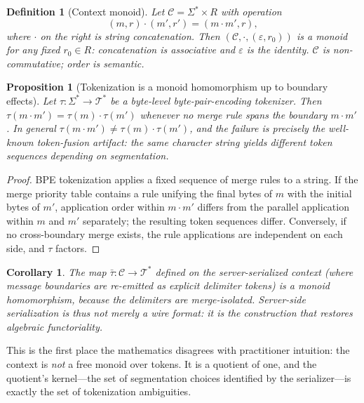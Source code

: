 \documentclass[11pt]{article}
\newtheorem{proposition}[theorem]{Proposition}
\newtheorem{definition}[theorem]{Definition}
\newtheorem{corollary}[theorem]{Corollary}
\begin{document}
\begin{definition}[Context monoid]
Let $\mathcal{C} = \Sigma^* \times R$ with operation
\[
(m, r) \cdot (m', r') = (m \cdot m', r),
\]
where $\cdot$ on the right is string concatenation. Then
$(\mathcal{C}, \cdot, (\varepsilon, r_0))$ is a monoid for any fixed
$r_0 \in R$: concatenation is associative and $\varepsilon$ is the identity.
$\mathcal{C}$ is non-commutative; order is semantic.
\end{definition}

\begin{proposition}[Tokenization is a monoid homomorphism up to boundary effects]
Let $\tau : \Sigma^* \to \mathcal{T}^*$ be a byte-level byte-pair-encoding
tokenizer. Then $\tau(m \cdot m') = \tau(m) \cdot \tau(m')$ \emph{whenever no
merge rule spans the boundary} $m \cdot m'$. In general
$\tau(m \cdot m') \neq \tau(m) \cdot \tau(m')$, and the failure is precisely
the well-known token-fusion artifact: the same character string yields
different token sequences depending on segmentation.
\end{proposition}

\begin{proof}
BPE tokenization applies a fixed sequence of merge rules to a string. If the
merge priority table contains a rule unifying the final bytes of $m$ with the
initial bytes of $m'$, application order within $m \cdot m'$ differs from the
parallel application within $m$ and $m'$ separately; the resulting token
sequences differ. Conversely, if no cross-boundary merge exists, the rule
applications are independent on each side, and $\tau$ factors.
\end{proof}

\begin{corollary}
The map $\bar\tau : \mathcal{C} \to \mathcal{T}^*$ defined on the
\emph{server-serialized} context (where message boundaries are re-emitted as
explicit delimiter tokens) \emph{is} a monoid homomorphism, because the
delimiters are merge-isolated. Server-side serialization is thus not merely a
wire format: it is the construction that restores algebraic functoriality.
\end{corollary}

This is the first place the mathematics disagrees with practitioner intuition:
the context is \emph{not} a free monoid over tokens. It is a quotient of one,
and the quotient's kernel---the set of segmentation choices identified by the
serializer---is exactly the set of tokenization ambiguities.
\end{document}
